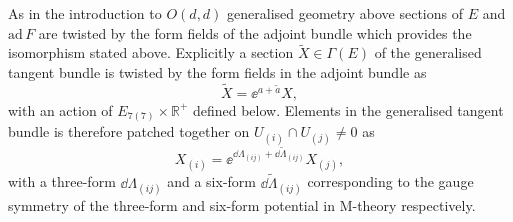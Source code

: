 As in the introduction to $O(d,d)$ generalised geometry above sections of $E$ and $\text{ad}\,F$ are twisted by the form fields of the adjoint bundle which provides the isomorphism stated above. Explicitly a section $\tilde{X}\in \Gamma(E)$ of the generalised tangent bundle is twisted by the form fields in the adjoint bundle as
\begin{equation}
    \tilde{X} = \ee^{a+\tilde{a}}X,
\end{equation}
with an action of $E_{7(7)}\times\mathbb{R}^+$ defined below. Elements in the generalised tangent bundle is therefore patched together on $U_{(i)}\cap U_{(j)}\neq 0$ as 
\begin{equation}
    X_{(i)} = \ee^{\dd\Lambda_{(ij)}+\dd\tilde{\Lambda}_{(ij)}}X_{(j)},
\end{equation}
with a three-form $\dd \Lambda_{(ij)}$  and a six-form $\dd\tilde{\Lambda}_{(ij)}$ corresponding to the gauge symmetry of the three-form and six-form potential in M-theory respectively. 


